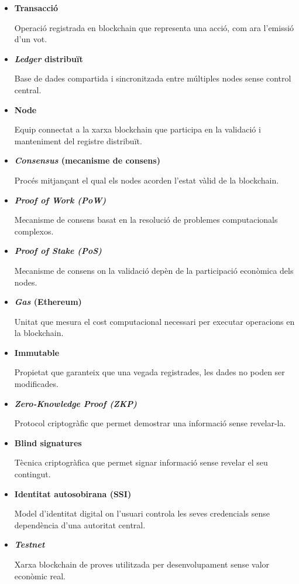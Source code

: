 \begin{itemize}
\item \hypertarget{def:transaccio}{\textbf{Transacció}} Operació registrada en blockchain que representa una acció, com ara l'emissió d'un vot.

\item \hypertarget{def:ledger}{\textbf{\textit{Ledger} distribuït}} Base de dades compartida i sincronitzada entre múltiples nodes sense control central.

\item \hypertarget{def:node}{\textbf{Node}} Equip connectat a la xarxa blockchain que participa en la validació i manteniment del registre distribuït.

\item \hypertarget{def:consensus}{\textbf{\textit{Consensus} (mecanisme de consens)}} Procés mitjançant el qual els nodes acorden l'estat vàlid de la blockchain.

\item \hypertarget{def:pow}{\textbf{\textit{Proof of Work (PoW)}}} Mecanisme de consens basat en la resolució de problemes computacionals complexos.

\item \hypertarget{def:pos}{\textbf{\textit{Proof of Stake (PoS)}}} Mecanisme de consens on la validació depèn de la participació econòmica dels nodes.

\item \hypertarget{def:gas}{\textbf{\textit{Gas} (Ethereum)}} Unitat que mesura el cost computacional necessari per executar operacions en la blockchain.

\item \hypertarget{def:immutable}{\textbf{Immutable}} Propietat que garanteix que una vegada registrades, les dades no poden ser modificades.

\item \hypertarget{def:zkp}{\textbf{\textit{Zero-Knowledge Proof (ZKP)}}} Protocol criptogràfic que permet demostrar una informació sense revelar-la.

\item \hypertarget{def:blindsignatures}{\textbf{Blind signatures}} Tècnica criptogràfica que permet signar informació sense revelar el seu contingut.

\item \hypertarget{def:ssi}{\textbf{Identitat autosobirana (SSI)}} Model d'identitat digital on l'usuari controla les seves credencials sense dependència d'una autoritat central.

\item \hypertarget{def:testnet}{\textbf{\textit{Testnet}}} Xarxa blockchain de proves utilitzada per desenvolupament sense valor econòmic real.


\end{itemize}
